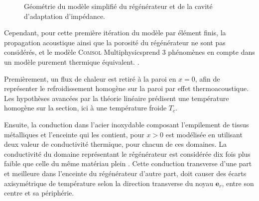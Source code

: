 \begin{figure}[!ht]
    \centering
    \caption{Géométrie du modèle simplifié du régénérateur et de la cavité d'adaptation d'impédance.}
    \label{fig:Comsol_ModeleSimplifie_Geometrie}
\end{figure}

Cependant, pour cette première itération du modèle par élément finis, la propagation acoustique ainsi que la porosité du régénérateur ne sont pas considérés, et le modèle \textsc{Comsol} Multiphysics\textss\textregistered prend 3 phénomènes en compte dans un modèle purement thermique équivalent. .\medskip

Premièrement, un flux de chaleur est retiré à la paroi en $x=0$, afin de représenter le refroidissement homogène sur la paroi par effet thermoacoustique. Les hypothèses avancées par la théorie linéaire prédisent une température homogène sur la section, ici à une température froide $T_c$.\smallskip

Ensuite, la conduction dans l'acier inoxydable composant l'empilement de tissus métalliques et l'enceinte qui les contient, pour $x>0$ est modélisée en utilisant deux valeur de conductivité thermique, pour chacun de ces domaines. La conductivité du domaine représentant le régénérateur est considérée dix fois plus faible que celle du même matériau plein \cite{swift_thermoacoustics_2017} . Cette conduction transverse d'une part et meilleure dans l'enceinte du régénérateur d'autre part, doit causer des écarts axisymétrique de température selon la direction transverse du noyau $\mathbf e_r$, entre son centre et sa périphérie.\smallskip

